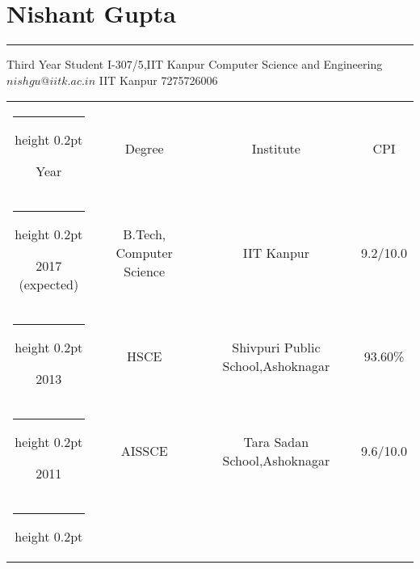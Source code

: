 \documentclass[a4paper]{article}
\author{Nishant Gupta}
\begin{document}
\makeatletter
\newcommand{\thickhline}{%
    \noalign {\ifnum 0=`}\fi \hrule height 1pt
    \futurelet \reserved@a \@xhline
}

\makeatletter
\newcommand{\thinhline}{%
    \noalign {\ifnum 0=`}\fi \hrule height 0.2pt
    \futurelet \reserved@a \@xhline
}

\section*{\textbf\Huge Nishant Gupta}
\hrule
\vspace{2mm}
Third Year Student  \hfill {I-307/5,IIT Kanpur} \newline
Computer Science and Engineering \hfill ${nishgu@iitk.ac.in}$ \newline
IIT Kanpur \hfill  {7275726006} 

\begin{center}
  \begin{tabular}{|c|c|c|c|} 
    \thinhline
    {\centering Year} & {\centering Degree} & {\centering Institute} & {\centering CPI} \\  
    \thinhline
    2017 (expected) & {B.Tech,  Computer Science} & IIT Kanpur  & 9.2/10.0  \\ 
    \thinhline
    2013 & {HSCE} & Shivpuri Public School,Ashoknagar & 			93.60\%	\\
    \thinhline
    2011 & AISSCE & Tara Sadan School,Ashoknagar  & 9.6/10.0   \\
    \thinhline
  \end{tabular}
\end{center}
\end{document}
